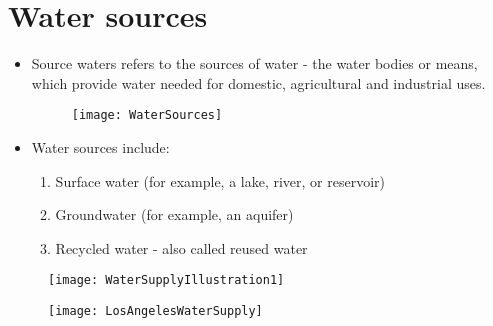 \section{Water sources}
\begin{itemize}
\item Source waters refers to the sources of water - the water bodies or means, which provide water needed for domestic, agricultural and industrial uses.
\begin{figure}[h]
\begin{center}
\texttt{[image: WaterSources]}\\
\label{Water supply sources}
\end{center}
\end{figure}
\item Water sources include:
\begin{enumerate}
\item Surface water (for example, a lake, river, or reservoir)
\item Groundwater (for example, an aquifer)
\item Recycled water - also called reused water\\
\end{enumerate}
\end{itemize}
\begin{figure}[h!]
\begin{center}
\texttt{[image: WaterSupplyIllustration1]}\\
 \label{Illustration of Southern California water supply systems}
\end{center}
\end{figure}

\begin{figure}[h!]
\begin{center}
\texttt{[image: LosAngelesWaterSupply]}\\
\label{Los Angeles area source water summary}
\end{center}
\end{figure}
